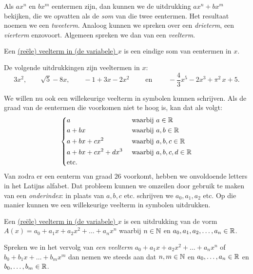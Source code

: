\documentclass{ximera}
\begin{document}
Als $ax^n$ en $bx^m$ eentermen zijn, dan kunnen we de uitdrukking $ax^n + bx^m$ bekijken, die we opvatten als de {\em som} van die twee eentermen. Het resultaat noemen we een {\em tweeterm}. Analoog kunnen we spreken over een {\em drieterm}, een {\em vierterm} enzovoort. Algemeen spreken we dan van een {\em veelterm}.

\begin{definition} 
Een \underline{(re\"ele) veelterm in (de variabele) $x$} is een eindige som van eentermen in $x$.
\end{definition} 

\begin{example} 
De volgende uitdrukkingen zijn veeltermen in $x$:
\[
3x^2, \qquad \sqrt{5} - 8x, \qquad -1 + 3x -2x^2 \qquad \text{ en } \qquad -\frac{4}{3}x^5 - 2x^3 + \pi^2\,x + 5. 
\]
\end{example} 

We willen nu ook een willekeurige veelterm in symbolen kunnen schrijven. Als de graad van de eentermen die voorkomen niet te hoog is, kan dat als volgt:
\begin{align*} 
\left\{
\begin{aligned}
& a && \text{ waarbij } a \in \mathbb{R}  \\
& a + bx && \text{ waarbij } a,b \in \mathbb{R}  \\
& a + bx + cx^2 && \text{ waarbij } a,b,c \in \mathbb{R}  \\
& a + bx + cx^2 + dx^3 && \text{ waarbij } a,b,c,d \in \mathbb{R} \\
& \text{etc.} && 
\end{aligned}
\right.
\end{align*}
Van zodra er een eenterm van graad $26$ voorkomt, hebben we onvoldoende letters in het Latijns alfabet. Dat probleem kunnen we omzeilen door gebruik te maken van een {\em onderindex}\:: in plaats van $a,b,c$ etc. schrijven we $a_0, a_1, a_2$ etc. Op die manier kunnen we een willekeurige veelterm in symbolen uitdrukken.

\begin{definition} 
Een \underline{(re\"ele) veelterm in (de variabele) $x$} is een uitdrukking van de vorm $A(x) = a_0 + a_1x + a_2x^2 + \dots + a_n x^n$ waarbij $n \in \mathbb{N}$ en $a_0,a_1,a_2,\ldots,a_n \in \mathbb{R}$.
\end{definition} 

Spreken we in het vervolg van {\em een veelterm} $a_0 + a_1x + a_2x^2 + \dots + a_n x^n$ of $b_0 + b_1x + \dots + b_m x^m$ dan nemen we steeds aan dat $n,m\in \mathbb{N}$ en $a_0, \ldots, a_n\in \mathbb{R}$ en $b_0, \ldots, b_m\in \mathbb{R}$.
\end{document}
